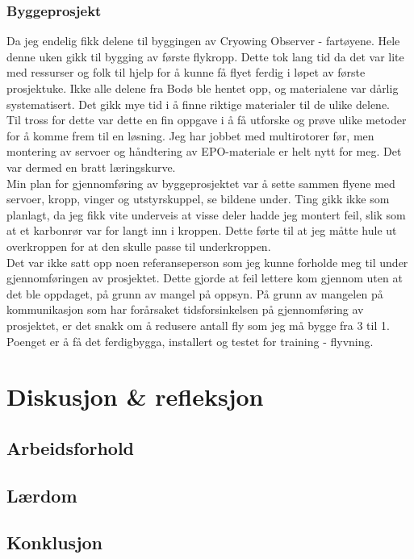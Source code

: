 \documentclass[12pt, a4paper]{report}
\begin{document}
\subsubsection{Byggeprosjekt}
Da jeg endelig fikk delene til byggingen av Cryowing Observer - fartøyene. Hele denne uken gikk til bygging av første flykropp. Dette tok lang tid da det var lite med ressurser og folk til hjelp for å kunne få flyet ferdig i løpet av første prosjektuke. Ikke alle delene fra Bodø ble hentet opp, og materialene var dårlig systematisert. Det gikk mye tid i å finne riktige materialer til de ulike delene.\\
Til tross for dette var dette en fin oppgave i å få utforske og prøve ulike metoder for å komme frem til en løsning. Jeg har jobbet med multirotorer før, men montering av servoer og håndtering av EPO-materiale er helt nytt for meg. Det var dermed en bratt læringskurve. \\ Min plan for gjennomføring av byggeprosjektet var å sette sammen flyene med servoer, kropp, vinger og utstyrskuppel, se bildene under.
Ting gikk ikke som planlagt, da jeg fikk vite underveis at visse deler hadde jeg montert feil, slik som at et karbonrør var for langt inn i kroppen. Dette førte til at jeg måtte hule ut overkroppen for at den skulle passe til underkroppen.\\
Det var ikke satt opp noen referanseperson som jeg kunne forholde meg til under gjennomføringen av prosjektet. Dette gjorde at feil lettere kom gjennom uten at det ble oppdaget, på grunn av mangel på oppsyn. På grunn av mangelen på kommunikasjon som har forårsaket tidsforsinkelsen på gjennomføring av prosjektet, er det snakk om å redusere antall fly som jeg må bygge fra 3 til 1. Poenget er å få det ferdigbygga, installert og testet for training - flyvning. 

\section{Diskusjon \& refleksjon}
\subsection{Arbeidsforhold}
\subsection{Lærdom}


\subsection{Konklusjon}
\end{document}

